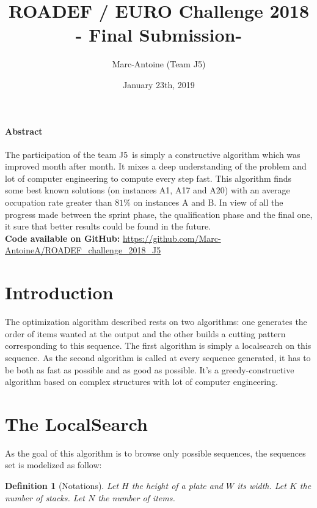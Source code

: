 \documentclass{article}
\title{ROADEF / EURO Challenge 2018 \\
    - Final Submission-}
\date{January 23th, 2019}
\author{Marc-Antoine \bsc{Augé} (Team J5)}
\newtheorem{definition}{Definition}
\begin{document}
        \maketitle

\paragraph{Abstract}
The participation of the team J5 is simply a constructive algorithm which was improved month after month. It mixes a deep understanding of the problem and lot of computer engineering to compute every step fast. This algorithm finds some best known solutions (on instances A1, A17 and A20) with an average occupation rate greater than $81\%$ on instances A and B. In view of all the progress made between the sprint phase, the qualification phase and the final one, it sure that better results could be found in the future.\\
\textbf{Code available on GitHub:} \url{https://github.com/Marc-AntoineA/ROADEF\_challenge\_2018\_J5}

\section{Introduction}

The optimization algorithm described rests on two algorithms: one generates the order of items wanted at the output and the other builds a cutting pattern corresponding to this sequence. The first algorithm is simply a localsearch on this sequence. As the second algorithm is called at every sequence generated, it has to be both as fast as possible and as good as possible. It's a greedy-constructive algorithm based on complex structures with lot of computer engineering.

\section{The LocalSearch}

As the goal of this algorithm is to browse only possible sequences, the sequences set is modelized as follow:

\begin{definition}[Notations]
    Let $H$ the height of a plate and $W$ its width. 
    Let $K$ the number of stacks. 
    Let $N$ the number of items.
\end{definition}
\end{document}
